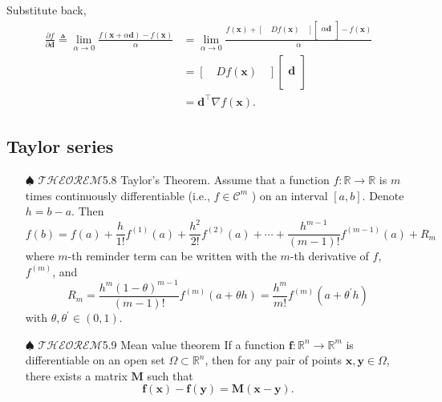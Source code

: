 \documentclass[12pt,thmsa]{article}
\begin{document}
Substitute back,
\[
\begin{aligned}
	\frac{\partial f}{\partial \boldsymbol{d}} \triangleq \lim _{\alpha \rightarrow 0} \frac{f(\boldsymbol{x}+\alpha \boldsymbol{d})-f(\boldsymbol{x})}{\alpha}
	&= \lim_{\alpha \rightarrow 0 } 
	\frac{ f(\boldsymbol{x}) + \left[ \quad D f \left( \boldsymbol{x} \right) \quad \right]
		\left[ \begin{aligned} \\ \alpha \boldsymbol{d} \\ \\ \end{aligned} \right]
		- f\left( \boldsymbol{x} \right)}
	{\alpha}\\
	&=\left[\quad Df\left(\boldsymbol{x}\right)\quad\right] \left[ \begin{array}{c} \\ \boldsymbol{d}  \\ \\ \end{array} \right]\\
	&=\boldsymbol{d}^{\top} \nabla f(\boldsymbol{x}).
\end{aligned}
\]


\subsection{Taylor series}

\begin{itemize}
	\item[\(\spadesuit\)] \(\mathscr{THEOREM}\)5.8 Taylor's Theorem. 
	Assume that a function \(f: \mathbb{R} \rightarrow \mathbb{R}\) is \(m\) times continuously differentiable (i.e., \(f \in \mathcal{C}^{m}\) ) on an interval \([a, b]\). Denote \(h=b-a\). Then
	\[
	f(b)=f(a)+\frac{h}{1 !} f^{(1)}(a)+\frac{h^{2}}{2 !} f^{(2)}(a)+\cdots+\frac{h^{m-1}}{(m-1) !} f^{(m-1)}(a)+R_{m}
	\]
	where \(m\)-th reminder term can be written with the \(m\)-th derivative of \(f\), \(f^{(m)}\), and
	\[
	R_{m}=\frac{h^{m}(1-\theta)^{m-1}}{(m-1) !} f^{(m)}(a+\theta h)=\frac{h^{m}}{m !} f^{(m)}\left(a+\theta^{\prime} h\right)
	\]
	with \(\theta, \theta^{\prime} \in(0,1)\).
	
	
	\item[\(\spadesuit\)] \(\mathscr{THEOREM}\)5.9 Mean value theorem
	If a function \(\boldsymbol{f}: \mathbb{R}^{n} \rightarrow \mathbb{R}^{m}\) is differentiable on an open set \(\Omega \subset \mathbb{R}^{n}\), then for any pair of points \(\boldsymbol{x}, \boldsymbol{y} \in \Omega\), there exists a matrix \(\boldsymbol{M}\) such that
	\[
	\boldsymbol{f}(\boldsymbol{x})-\boldsymbol{f}(\boldsymbol{y})
	=\boldsymbol{M}(\boldsymbol{x}-\boldsymbol{y}).
	\]

\end{itemize}
\end{document}
